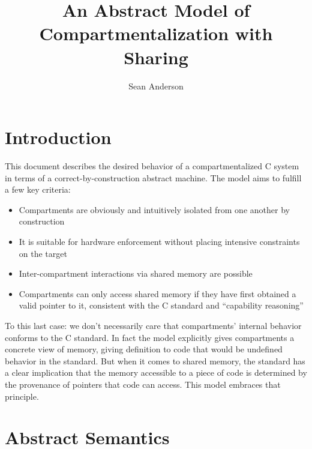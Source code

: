 \documentclass{article}
\title{An Abstract Model of Compartmentalization with Sharing}
\author{Sean Anderson}
\begin{document}
\maketitle




\section{Introduction}

This document describes the desired behavior of a compartmentalized C system in terms
of a correct-by-construction abstract machine. The model aims to fulfill a few key
criteria:

\begin{itemize}
\item Compartments are obviously and intuitively isolated from one another
  by construction
\item It is suitable for hardware enforcement without placing intensive constraints
  on the target
\item Inter-compartment interactions via shared memory are possible
\item Compartments can only access shared memory if they have first obtained a
  valid pointer to it, consistent with the C standard and ``capability reasoning''
\end{itemize}

To this last case: we don't necessarily care that compartments' internal behavior
conforms to the C standard. In fact the model explicitly gives compartments
a concrete view of memory, giving definition to code that would be undefined behavior
in the standard. But when it comes to shared memory, the standard has a clear
implication that the memory accessible to a piece of code is determined by
the provenance of pointers that code can access. This model embraces that principle.

\section{Abstract Semantics}
\end{document}
